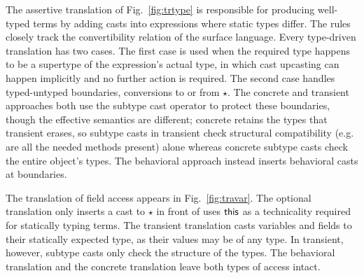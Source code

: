 \documentclass[a4paper,UKenglish]{lipics-v2018}
\newcommand{\EM}[1]{\ensuremath{#1}\xspace}
\newcommand{\xt}[1]{{\sf{#1}}}
\newcommand{\EMxt}[1]{\EM{\xt{#1}}}
\newcommand{\any}{\EM{\star}}
\newcommand{\this}{\EMxt{this}}
\newcommand{\figref}[1]{Fig.~\ref{#1}\xspace}
\newcounter{rules}
\newcounter{conds}
\newcounter{cond}[conds]
\begin{document}
The assertive translation of \figref{fig:trtype} is responsible for producing
well-typed terms by adding casts into expressions where static types differ.
The rules closely track the convertibility relation of the surface language.
Every type-driven translation has two cases. The first case is used when the
required type happens to be a supertype of the expression's actual type, in
which cast upcasting can happen implicitly and no further action is required.
The second case handles typed-untyped boundaries, conversions to or from \any.
The concrete and transient approaches both use the subtype cast operator to
protect these boundaries, though the effective semantics are different; concrete
retains the types that transient erases, so subtype casts in transient check
structural compatibility (e.g. are all the needed methods present) alone
whereas concrete subtype casts check the entire object's types.
The behavioral approach instead inserts behavioral casts
at boundaries.

\enlargethispage{1.5\baselineskip}
The translation of field access appears in \figref{fig:travar}. The
optional translation only inserts a cast to \any in front of uses 
\this as a technicality required for statically typing terms. The
transient translation casts variables and fields to their statically
expected type, as their values may be of any type. In transient, however,
subtype casts only check the structure of the types. The behavioral
translation and the concrete translation leave both types of access intact.
\end{document}
